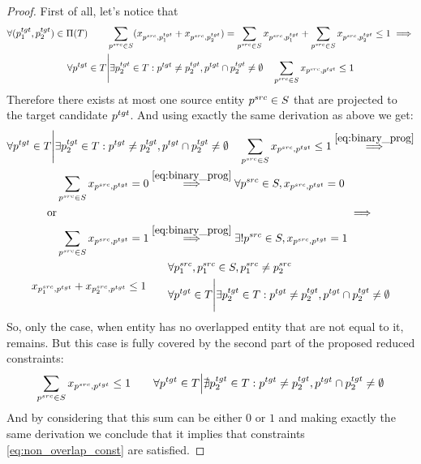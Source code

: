 \begin{proof}
  First of all, let's notice that
  \begin{multline*}
    \forall (p_1^{tgt}, p_2^{tgt}) \in \Pi(T)
    \qquad
    \sum\limits_{p^{src} \in S} (x_{p^{src}, p_1^{tgt}} + x_{p^{src}, p_2^{tgt}})
    =
    \sum\limits_{p^{src} \in S} x_{p^{src}, p_1^{tgt}} +
    \sum\limits_{p^{src} \in S} x_{p^{src}, p_2^{tgt}} \leq 1
    \implies                        \\
    \forall p^{tgt} \in T \Bigg| \exists p_2^{tgt} \in T: p^{tgt} \neq p_2^{tgt}, p^{tgt} \cap p_2^{tgt} \neq \emptyset
    \quad
    \sum\limits_{p^{src} \in S} x_{p^{src}, p^{tgt}} \leq 1
  \end{multline*}
  Therefore there exists at most one source entity \( p^{src} \in S \) that are projected
  to the target candidate \( p^{tgt} \).
  And using exactly the same derivation as above we get:
  \begin{multline*}
    \forall p^{tgt} \in T \Bigg| \exists p_2^{tgt} \in T: p^{tgt} \neq p_2^{tgt}, p^{tgt} \cap p_2^{tgt} \neq \emptyset
    \quad
    \sum\limits_{p^{src} \in S} x_{p^{src}, p^{tgt}} \leq 1
    \stackrel{\eqref{eq:binary_prog}}{\implies}                                                                                                                                                       \\
    \begin{aligned}
      & \sum\limits_{p^{src} \in S} x_{p^{src}, p^{tgt}} = 0
      \stackrel{\eqref{eq:binary_prog}}{\implies}
      \forall p^{src} \in S, x_{p^{src}, p^{tgt}} = 0         \\
      \text{or}                                               \\
      & \sum\limits_{p^{src} \in S} x_{p^{src}, p^{tgt}} = 1
      \stackrel{\eqref{eq:binary_prog}}{\implies}
      \exists! p^{src} \in S, x_{p^{src}, p^{tgt}} = 1        \\
    \end{aligned} \implies \\
    x_{p_1^{src}, p^{tgt}} + x_{p_2^{src}, p^{tgt}} \leq 1 \qquad
    \begin{aligned}
      & \forall p_1^{src}, p_1^{src} \in S, p_1^{src} \neq p_2^{src}                                                        \\
      & \forall p^{tgt} \in T \Bigg| \exists p_2^{tgt} \in T: p^{tgt} \neq p_2^{tgt}, p^{tgt} \cap p_2^{tgt} \neq \emptyset
    \end{aligned}
  \end{multline*}
  So, only the case, when entity has no overlapped entity that are
  not equal to it, remains. But this case is fully covered by the second part of the proposed reduced constraints:
  \[
    \sum\limits_{p^{src} \in S} x_{p^{src}, p^{tgt}} \leq 1 \qquad
    \forall p^{tgt} \in T \Big| \nexists p_2^{tgt} \in T: p^{tgt} \neq p_2^{tgt}, p^{tgt} \cap p_2^{tgt} \neq \emptyset
  \]
  And by considering that this sum can be either \( 0 \) or \( 1 \) and making
  exactly the same derivation we conclude that it implies that
  constraints \eqref{eq:non_overlap_const} are satisfied.
\end{proof}

